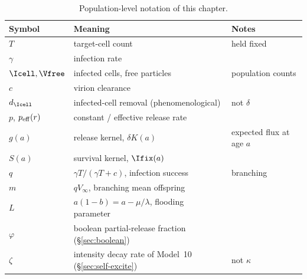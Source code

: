 \begin{table}[H]
\centering
\renewcommand{\arraystretch}{1.25}
\small
\begin{tabular}{@{}llp{}@{}}
\toprule
Symbol & Meaning & Notes \\
\midrule
$T$ & target-cell count & held fixed \\
$\gamma$ & infection rate & \\
$\Icell,\Vfree$ & infected cells, free particles & population counts \\
$c$ & virion clearance & \\
$d_{\Icell}$ & infected-cell removal (phenomenological) & not $\delta$ \\
$p$, $p_{\rm eff}(r)$ & constant / effective release rate & \\
$g(a)$ & release kernel, $\delta K(a)$ & expected flux at age $a$ \\
$S(a)$ & survival kernel, $\Ifix(a)$ & \\
$q$ & $\gamma T/(\gamma T+c)$, infection success & branching \\
$m$ & $qV_\infty$, branching mean offspring & \\
$L$ & $a(1-b)=a-\mu/\lambda$, flooding parameter & \\
$\varphi$ & boolean partial-release fraction (\S\ref{sec:boolean}) & \\
$\zeta$ & intensity decay rate of Model~10 (\S\ref{sec:self-excite}) & not $\kappa$ \\
\bottomrule
\end{tabular}
\caption{Population-level notation of this chapter.}
\label{tab:notation-pop}
\end{table}
